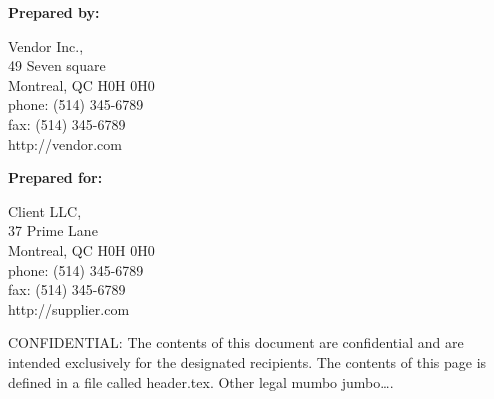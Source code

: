 \begin{titlingpage}
  \maketitle
  \vfill
\end{titlingpage}

\pagebreak

\textbf{Prepared by:}

Vendor Inc.,\\49 Seven square\\Montreal, QC H0H 0H0\\phone: (514)
345-6789\\fax: (514) 345-6789\\http://vendor.com

\textbf{}

\textbf{Prepared for:}

Client LLC,\\37 Prime Lane\\Montreal, QC H0H 0H0\\phone: (514)
345-6789\\fax: (514) 345-6789\\http://supplier.com

\vfill

CONFIDENTIAL: The contents of this document are confidential and are
intended exclusively for the designated recipients. The contents of this page
is defined in a file called header.tex. Other legal mumbo jumbo\ldots{}.

\pagebreak
